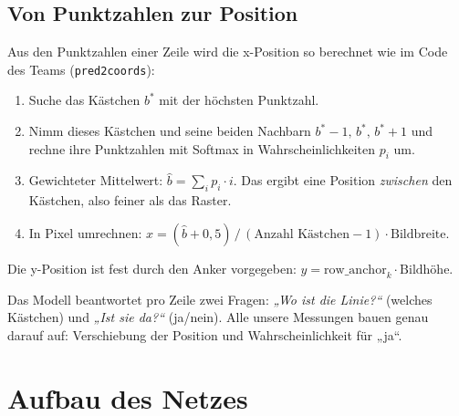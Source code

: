 \documentclass[11pt,a4paper]{article}
\newcommand{\code}[1]{\texttt{#1}}
\begin{document}
\subsection{Von Punktzahlen zur Position}

Aus den Punktzahlen einer Zeile wird die x-Position so berechnet wie im Code des Teams
(\code{pred2coords}):

\begin{enumerate}
  \item Suche das Kästchen $b^\ast$ mit der höchsten Punktzahl.
  \item Nimm dieses Kästchen und seine beiden Nachbarn $b^\ast-1,\,b^\ast,\,b^\ast+1$ und
        rechne ihre Punktzahlen mit Softmax in Wahrscheinlichkeiten $p_i$ um.
  \item Gewichteter Mittelwert: $\hat b = \sum_i p_i \cdot i$. Das ergibt eine Position
        \emph{zwischen} den Kästchen, also feiner als das Raster.
  \item In Pixel umrechnen: $x = (\hat b + 0{,}5)\,/\,(\text{Anzahl Kästchen} - 1) \cdot
        \text{Bildbreite}$.
\end{enumerate}

Die y-Position ist fest durch den Anker vorgegeben: $y = \text{row\_anchor}_k \cdot
\text{Bildhöhe}$.

\begin{merke}
Das Modell beantwortet pro Zeile zwei Fragen: \emph{„Wo ist die Linie?“} (welches Kästchen) und
\emph{„Ist sie da?“} (ja/nein). Alle unsere Messungen bauen genau darauf auf: Verschiebung der
Position und Wahrscheinlichkeit für „ja“.
\end{merke}

\section{Aufbau des Netzes}
\end{document}
